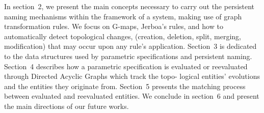 In section~2, we present the
main concepts necessary to carry out the persistent naming
mechanisms within the framework of a system, making use of
graph transformation rules. We
focus on G-maps, Jerboa’s rules, and how to
automatically detect topological
changes, (creation, deletion, split, merging, modification) that
may occur upon any rule’s application. Section~3 is dedicated to the data structures
used by parametric specifications and persistent naming. Section~4 describes how
a parametric specification is evaluated or reevaluated through Directed Acyclic Graphs which track the topo-
logical entities’ evolutions and the entities they originate from. Section~5 presents the matching process between evaluated and reevaluated entities. We conclude in section~6 and present the main directions of our future works.

